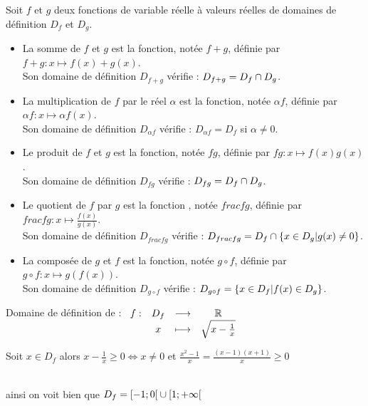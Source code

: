 \begin{defi} 
	Soit \(f\) et \(g\) deux fonctions de variable réelle à valeurs réelles de domaines de définition \(D_f\) et \(D_g\).
	\begin{itemize}
		\item La somme de \(f\) et \(g\) est la fonction, notée \(f + g\), définie par \(f + g : x \mapsto f(x) + g(x)\). \\
		      Son domaine de définition \(D_{f+g}\) vérifie : \(D_{f+g} = D_f \cap D_g\).
		\item  La multiplication de \(f\) par le réel \(\alpha\) est la fonction, notée \(\alpha f\), définie par \(\alpha f : x \mapsto \alpha f(x)\). \\
		      Son domaine de définition \(D_{\alpha f}\) vérifie : \(D_{\alpha f} = D_f\) si \(\alpha \neq 0\).
		\item Le produit de \(f\) et \(g\) est la fonction, notée \(f g\), définie par \(f g : x \mapsto f(x)g(x)\). \\
		      Son domaine de définition \(D_{fg}\) vérifie : \(D_{fg} = D_f \cap D_g\).
		\item Le quotient de \(f\) par \(g\) est la fonction , notée \(frac{f}{g}\), définie par \(frac{f}{g} : x \mapsto \frac{f(x)}{g(x)}\). \\
		      Son domaine de définition \(D_{frac{f}{g}}\) vérifie : \(D_{frac{f}{g}} = D_f \cap \left\lbrace x \in D_g | g(x) \neq 0\right\rbrace\).
		\item La composée de \(g\) et \(f\) est la fonction, notée \(g \circ f\), définie par \(g \circ f : x \mapsto g(f(x))\). \\
		      Son domaine de définition \(D_{g \circ f}\) vérifie : \(D_{g \circ f} = \left\lbrace x \in D_f | f(x) \in D_g\right\rbrace\).
	\end{itemize}
\end{defi}

\begin{exoex}
	Domaine de définition de : \(\begin{array}[t]{cccc}f : & D_f & \longrightarrow & \mathbb{R} \\ & x & \longmapsto & \sqrt{x-\frac{1}{x}}\end{array} \)
\end{exoex}

\begin{corr}
	Soit \(x \in D_f\) alors \(x-\frac{1}{x} \geq 0 \iff x\neq 0\) et \(\frac{x^2-1}{x} = \frac{(x-1)(x+1)}{x} \geq 0\)\\
	\\
    ainsi on voit bien que \(D_f = \left[-1;0\right[\cup\left[1;+\infty\right[\) 
\end{corr}

